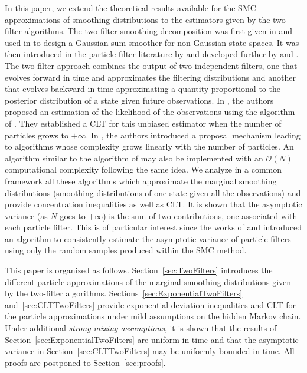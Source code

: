 In this paper, we extend the theoretical results available for the SMC approximations of smoothing distributions to the estimators given by the two-filter algorithms. The two-filter smoothing decomposition was first given in \cite{bresler:1986} and used in \cite{kitagawa:1994} to design a Gaussian-sum smoother for non Gaussian state spaces. It was then introduced in the particle filter literature by \cite{kitagawa:1996} and developed further by \cite{briers:doucet:maskell:2010} and \cite{fearnhead:wyncoll:tawn:2010}. The two-filter approach combines the output of two independent filters, one that evolves forward in time and approximates the filtering distributions and another that evolves backward in time approximating a quantity proportional to the posterior distribution of a state given future observations.  In \cite{persing:jasra:2013}, the authors proposed an estimation of the likelihood of the observations using the algorithm of \cite{briers:doucet:maskell:2010}. They established a CLT for this unbiased estimator when the number of particles grows to $+\infty$. In \cite{fearnhead:wyncoll:tawn:2010}, the authors introduced a proposal mechanism leading to algorithms whose complexity grows linearly with the number of particles.  An algorithm similar to the algorithm of  \cite{briers:doucet:maskell:2010} may also be implemented with an $\mathcal{O}(N)$ computational complexity following the same idea. We analyze in a common framework all these algorithms which approximate the marginal smoothing distributions (smoothing distributions of one state given all the observations) and provide concentration inequalities as well as CLT. It is shown that the asymptotic variance (as $N$ goes to $+\infty$) is the sum of two contributions, one associated with each particle filter. This is of particular interest since the works of \cite{lee:whiteley:2015} and \cite{douc:olsson:2017}  introduced an algorithm to consistently estimate the asymptotic variance of particle filters using only the random samples produced within the SMC method.

This paper is organized as follows. Section~\ref{sec:TwoFilters} introduces the different particle approximations of the marginal smoothing distributions given by the two-filter algorithms. Sections~\ref{sec:ExponentialTwoFilters} and~\ref{sec:CLTTwoFilters} provide exponential deviation inequalities and CLT for the particle approximations under mild assumptions on the hidden Markov chain. Under additional {\em strong mixing assumptions}, it is shown that the results of Section~\ref{sec:ExponentialTwoFilters} are uniform in time and that the asymptotic variance in Section~\ref{sec:CLTTwoFilters} may be uniformly bounded in time. All proofs are postponed to Section~\ref{sec:proofs}.

